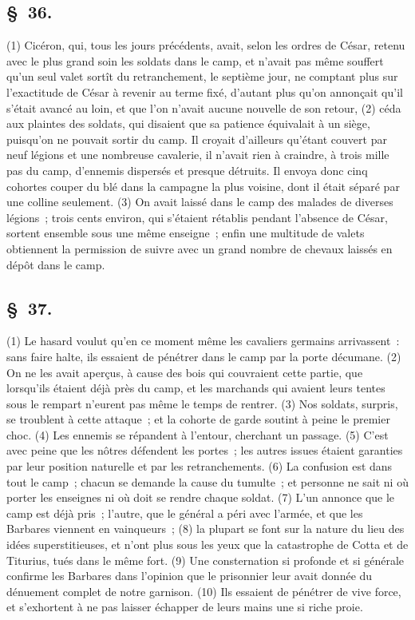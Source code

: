 \documentclass[french,twoside]{book} %
\begin{document}
\subsection[{§ 36.}]{ \textsc{§ 36.} }
\noindent (1) Cicéron, qui, tous les jours précédents, avait, selon les ordres de César, retenu avec le plus grand soin les soldats dans le camp, et n’avait pas même souffert qu’un seul valet sortît du retranchement, le septième jour, ne comptant plus sur l’exactitude de César à revenir au terme fixé, d’autant plus qu’on annonçait qu’il s’était avancé au loin, et que l’on n’avait aucune nouvelle de son retour, (2) céda aux plaintes des soldats, qui disaient que sa patience équivalait à un siège, puisqu’on ne pouvait sortir du camp. Il croyait d’ailleurs qu’étant couvert par neuf légions et une nombreuse cavalerie, il n’avait rien à craindre, à trois mille pas du camp, d’ennemis dispersés et presque détruits. Il envoya donc cinq cohortes couper du blé dans la campagne la plus voisine, dont il était séparé par une colline seulement. (3) On avait laissé dans le camp des malades de diverses légions ; trois cents environ, qui s’étaient rétablis pendant l’absence de César, sortent ensemble sous une même enseigne ; enfin une multitude de valets obtiennent la permission de suivre avec un grand nombre de chevaux laissés en dépôt dans le camp.
\subsection[{§ 37.}]{ \textsc{§ 37.} }
\noindent (1) Le hasard voulut qu’en ce moment même les cavaliers germains arrivassent : sans faire halte, ils essaient de pénétrer dans le camp par la porte décumane. (2) On ne les avait aperçus, à cause des bois qui couvraient cette partie, que lorsqu’ils étaient déjà près du camp, et les marchands qui avaient leurs tentes sous le rempart n’eurent pas même le temps de rentrer. (3) Nos soldats, surpris, se troublent à cette attaque ; et la cohorte de garde soutint à peine le premier choc. (4) Les ennemis se répandent à l’entour, cherchant un passage. (5) C'est avec peine que les nôtres défendent les portes ; les autres issues étaient garanties par leur position naturelle et par les retranchements. (6) La confusion est dans tout le camp ; chacun se demande la cause du tumulte ; et personne ne sait ni où porter les enseignes ni où doit se rendre chaque soldat. (7) L'un annonce que le camp est déjà pris ; l’autre, que le général a péri avec l’armée, et que les Barbares viennent en vainqueurs ; (8) la plupart se font sur la nature du lieu des idées superstitieuses, et n’ont plus sous les yeux que la catastrophe de Cotta et de Titurius, tués dans le même fort. (9) Une consternation si profonde et si générale confirme les Barbares dans l’opinion que le prisonnier leur avait donnée du dénuement complet de notre garnison. (10) Ils essaient de pénétrer de vive force, et s’exhortent à ne pas laisser échapper de leurs mains une si riche proie.
\end{document}
